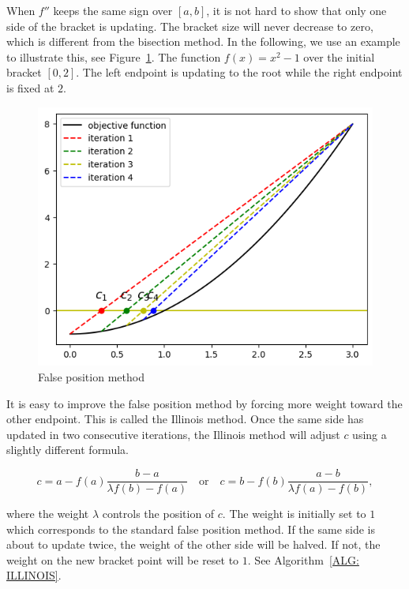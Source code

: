 \begin{remark}
    When $f''$ keeps the same sign over $[a, b]$, it is not hard to show that only one side of the bracket is updating. The bracket size will never decrease to zero, which is different from the bisection method. In the following, we use an example to illustrate this, see Figure~\ref{FIG: 0-RO-FI-FA}. The function $f(x) = x^2 - 1$ over the initial bracket $[0, 2]$. The left endpoint is updating to the root while the right endpoint is fixed at $2$.

\begin{figure}[!htb]
    \centering
\includegraphics[scale=0.6]{Figures/root_finding_img_0.png}
    \caption{False position method}
    \label{FIG: 0-RO-FI-FA}
\end{figure}
\end{remark}

It is easy to improve the false position method by forcing more weight toward the other endpoint. This is called the Illinois method. Once the same side has updated in two consecutive iterations, the Illinois method will adjust $c$ using a slightly different formula.

$$
{c} = a - f(a)\frac{ b - a }{\lambda f(b) - f(a)}
\quad \text{or}\quad 
{c} =  b -  f(b) \frac{a - b}{\lambda f(a) - f(b)},
$$

where the weight $\lambda$ controls the position of $c$. The weight is initially set to $1$ which corresponds to the standard false position method. If the same side is about to update twice, the weight of the other side will be halved. If not, the weight on the new bracket point will be reset to $1$. See Algorithm~\ref{ALG: ILLINOIS}.

